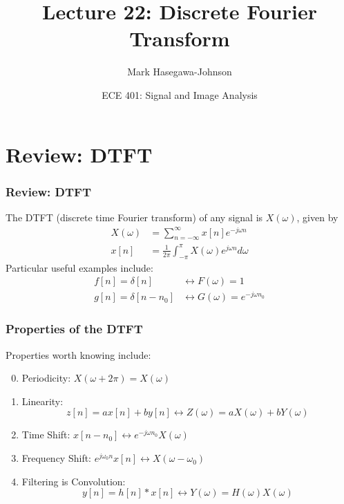 \documentclass{beamer}
\title{Lecture 22: Discrete Fourier Transform}
\author{Mark Hasegawa-Johnson}
\date{ECE 401: Signal and Image Analysis}
\begin{document}
\begin{frame}
  \maketitle
\end{frame}

\begin{frame}
  \tableofcontents
\end{frame}

\section[DTFT]{Review: DTFT}
\setcounter{subsection}{1}

\begin{frame}
  \frametitle{Review: DTFT}

  The DTFT (discrete time Fourier transform) of any signal is
  $X(\omega)$, given by
  \begin{align*}
    X(\omega) &= \sum_{n=-\infty}^\infty x[n]e^{-j\omega n}\\
    x[n] &= \frac{1}{2\pi}\int_{-\pi}^\pi X(\omega)e^{j\omega n}d\omega
  \end{align*}
  Particular useful examples include:
  \begin{align*}
    f[n]=\delta[n] &\leftrightarrow F(\omega)=1\\
    g[n]=\delta[n-n_0] &\leftrightarrow G(\omega)=e^{-j\omega n_0}
  \end{align*}
\end{frame}

\begin{frame}
  \frametitle{Properties of the DTFT}

  Properties worth knowing  include:
  \begin{enumerate}
    \setcounter{enumi}{-1}
  \item Periodicity: $X(\omega+2\pi)=X(\omega)$
  \item Linearity:
    \[z[n]=ax[n]+by[n]\leftrightarrow Z(\omega)=aX(\omega)+bY(\omega)
    \]
  \item Time Shift: $x[n-n_0]\leftrightarrow e^{-j\omega n_0}X(\omega)$
  \item Frequency Shift: $e^{j\omega_0 n}x[n]\leftrightarrow X(\omega-\omega_0)$
  \item Filtering is Convolution:
    \[
    y[n]=h[n]\ast x[n]\leftrightarrow Y(\omega)=H(\omega)X(\omega)
    \]
  \end{enumerate}
\end{frame}
\end{document}
